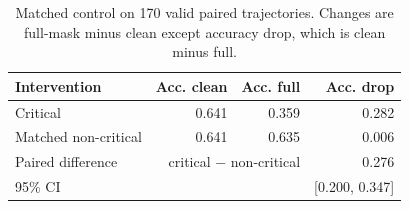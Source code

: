 \begin{table}[t]
\centering
\caption{Matched control on 170 valid paired trajectories. Changes are full-mask minus clean except accuracy drop, which is clean minus full.}
\label{tab:control}
\footnotesize
\setlength{\tabcolsep}{3pt}
\begin{tabular}{lrrr}
\toprule
Intervention & Acc. clean & Acc. full & Acc. drop \\
\midrule
Critical & 0.641 & 0.359 & 0.282 \\
Matched non-critical & 0.641 & 0.635 & 0.006 \\
\midrule
Paired difference & \multicolumn{2}{r}{critical $-$ non-critical} & 0.276 \\
95\% CI & \multicolumn{2}{r}{} & [0.200, 0.347] \\
\bottomrule
\end{tabular}
\end{table}
